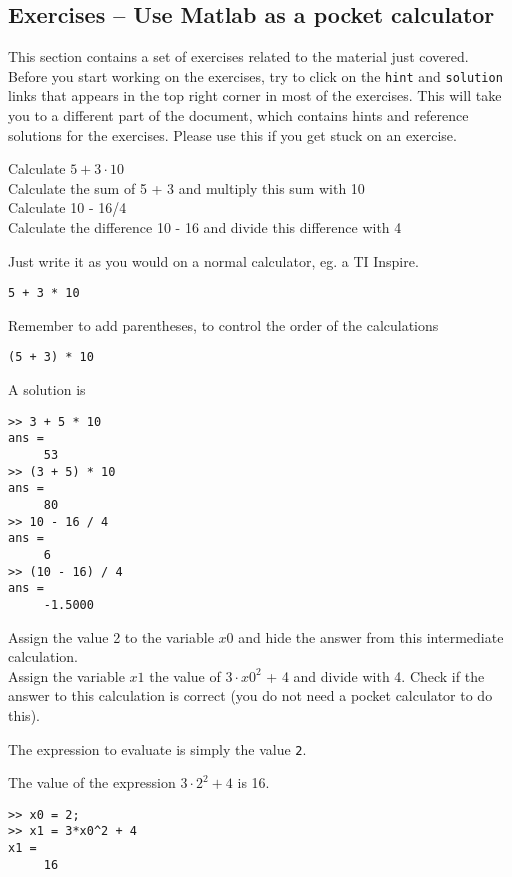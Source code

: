 \subsection{Exercises -- Use Matlab as a pocket calculator}

This section contains a set of exercises related to the material 
just covered.
Before you start working on the exercises, try to click on the 
\verb!hint! and \verb!solution! links that appears in the top 
right corner in most of the exercises.
This will take you to a different part of the document, which contains 
hints and reference solutions for the exercises.
Please use this if you get stuck on an exercise.

\begin{ex}
Calculate $5 + 3 \cdot 10$\\
Calculate the sum of 5 + 3 and multiply this sum with 10\\
Calculate 10 - 16/4\\
Calculate the difference 10 - 16 and divide this difference with 4
\begin{hint}
Just write it as you would on a normal calculator, eg. a TI Inspire.
\begin{lstlisting}
5 + 3 * 10
\end{lstlisting}
\end{hint}
\begin{secondhint}
Remember to add parentheses, to control the order of the calculations
\begin{lstlisting}
(5 + 3) * 10
\end{lstlisting}
\end{secondhint}
\begin{sol}
A solution is
\begin{lstlisting}
>> 3 + 5 * 10
ans = 
     53
>> (3 + 5) * 10
ans = 
     80
>> 10 - 16 / 4
ans = 
     6
>> (10 - 16) / 4
ans = 
     -1.5000
\end{lstlisting}
\end{sol}
\end{ex}
\known{+, -, *, /}

\begin{ex}
Assign the value 2 to the variable $x0$ and hide the answer from this intermediate
calculation.\\
Assign the variable $x1$ the value of $3 \cdot x0^2$ + 4 and divide with 4. Check if the answer to
this calculation is correct (you do not need a pocket calculator to do this).
\begin{hint}
The expression to evaluate is simply the value \verb!2!.
\end{hint}
\begin{secondhint}
The value of the expression $3 \cdot 2^2 + 4$ is 16.
\end{secondhint}
\begin{sol}
\begin{lstlisting}
>> x0 = 2;
>> x1 = 3*x0^2 + 4
x1 = 
     16
\end{lstlisting}
\end{sol}
\end{ex}
\known{=, \^}


